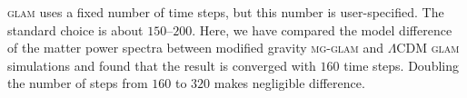 

\textsc{glam} uses a fixed number of time steps, but this number is user-specified. The standard choice is about $150$--$200$. Here, we have compared the model difference of the matter power spectra between modified gravity \textsc{mg-glam} and $\Lambda$CDM \textsc{glam} simulations and found that the result is converged with $160$ time steps. Doubling the number of steps from $160$ to $320$ makes negligible difference. 

